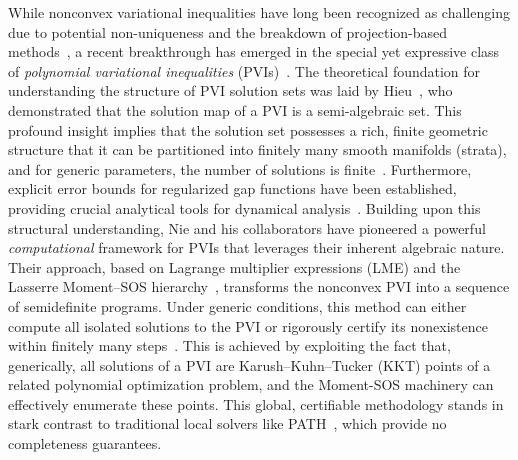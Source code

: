 \documentclass[sn-basic,Numbered]{sn-jnl}
\theoremstyle{thmstyleone}%
\begin{document}
While nonconvex variational inequalities have long been recognized as challenging due to potential non-uniqueness and the breakdown of projection-based methods~\cite{FacchineiPang}, a recent breakthrough has emerged in the special yet expressive class of \emph{polynomial variational inequalities} (PVIs)~\cite{Gowda2017,Huang2019,Qi2019}. The theoretical foundation for understanding the structure of PVI solution sets was laid by Hieu~\cite{Hieu2020}, who demonstrated that the solution map of a PVI is a semi-algebraic set. This profound insight implies that the solution set possesses a rich, finite geometric structure that it can be partitioned into finitely many smooth manifolds (strata), and for generic parameters, the number of solutions is finite~\cite{Hieu2019,Huong2016}. Furthermore, explicit error bounds for regularized gap functions have been established, providing crucial analytical tools for dynamical analysis~\cite{Dinh2021}.
Building upon this structural understanding, Nie and his collaborators have pioneered a powerful \emph{computational} framework for PVIs that leverages their inherent algebraic nature. Their approach, based on Lagrange multiplier expressions (LME) and the Lasserre Moment--SOS hierarchy~\cite{Nie2019,Nie2023book,Nie2025}, transforms the nonconvex PVI into a sequence of semidefinite programs. Under generic conditions, this method can either compute all isolated solutions to the PVI or rigorously certify its nonexistence within finitely many steps~\cite{nie2013finite}. This is achieved by exploiting the fact that, generically, all solutions of a PVI are Karush–Kuhn–Tucker (KKT) points of a related polynomial optimization problem, and the Moment-SOS machinery can effectively enumerate these points. This global, certifiable methodology stands in stark contrast to traditional local solvers like PATH~\cite{Dirkse1995,Ferris1999}, which provide no completeness guarantees.
\end{document}
